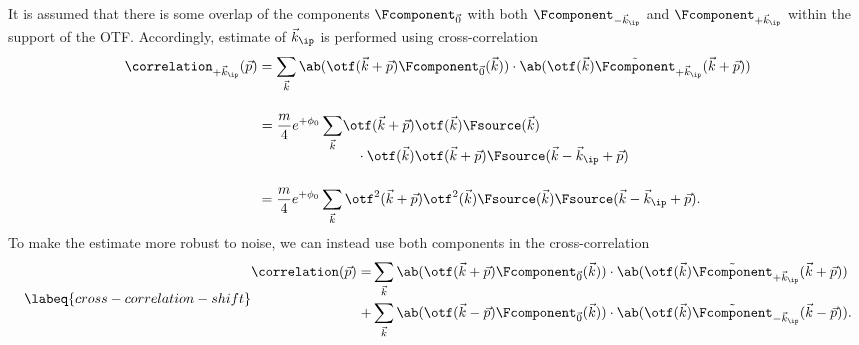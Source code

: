 It is assumed that there is some overlap of the components \(\Fcomponent_{\vec{0}}\) with both
\(\Fcomponent_{-\vec{k}_\ip}\) and \(\Fcomponent_{+\vec{k}_\ip}\) within the support of the \ac{OTF}.
Accordingly, estimate of \(\vec{k}_\ip\) is performed using cross-correlation
    \begin{equation*}
        \begin{split}
            \correlation_{+\vec{k}_\ip}(\vec{p}) &= \sum_{\vec{k}} \ab(\otf(\vec{k} + \vec{p})
            \Fcomponent_{\vec{0}}(\vec{k}))\cdot\ab(\otf(\vec{k})\tilde{\Fcomponent}_{+\vec{k}_{\ip}}(\vec{k}
            + \vec{p})) \\[1.2em]
                                 &\hspace{0.3em}\begin{aligned}
                                     =\frac{m}{4}e^{+\phi_0} \sum_{\vec{k}} &\otf(\vec{k}
                                     + \vec{p})\otf(\vec{k})\Fsource(\vec{k}) \\[-0.7em]
                                                                            &  \hspace{1em} \cdot\otf(\vec{k})\otf(\vec{k} + \vec{p})\Fsource(\vec{k} - \vec{k}_\ip + \vec{p})
                                 \end{aligned} \\[1.2em]
                                 &= \frac{m}{4}e^{+\phi_0} \sum_{\vec{k}} \otf^2(\vec{k} + \vec{p}) \otf^2(\vec{k}) \Fsource(\vec{k})
                                 \Fsource(\vec{k} - \vec{k}_\ip + \vec{p}).
        \end{split}
    \end{equation*}
To make the estimate more robust to noise, we can instead use both components in the cross-correlation
    \begin{equation}
        \labeq{cross-correlation-shift}
            \begin{split}
                \correlation(\vec{p}) = &\sum_{\vec{k}} \ab(\otf(\vec{k} + \vec{p})
                \Fcomponent_{\vec{0}}(\vec{k}))\cdot\ab(\otf(\vec{k})\tilde{\Fcomponent}_{+\vec{k}_{\ip}}(\vec{k}
                + \vec{p})) \\
                                                    + &\sum_{\vec{k}} \ab(\otf(\vec{k} - \vec{p})
                \Fcomponent_{\vec{0}}(\vec{k}))\cdot\ab(\otf(\vec{k})\tilde{\Fcomponent}_{-\vec{k}_{\ip}}(\vec{k}
                - \vec{p})).
            \end{split}
    \end{equation}
